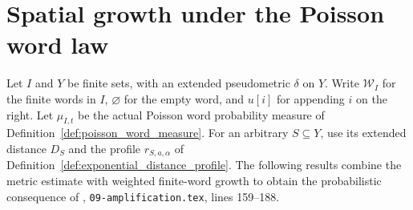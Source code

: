 \section{Spatial growth under the Poisson word law}
\label{sec:poisson_word_spatial_growth}

Let $I$ and $Y$ be finite sets, with an extended pseudometric
$\delta$ on $Y$.  Write $\mathcal W_I$ for the finite words in $I$,
$\varnothing$ for the empty word, and $u[i]$ for appending $i$ on
the right.  Let $\mu_{I,t}$ be the actual Poisson word probability
measure of Definition~\ref{def:poisson_word_measure}.
For an arbitrary $S\subseteq Y$, use its extended distance $D_S$
and the profile $r_{S,a,\alpha}$ of
Definition~\ref{def:exponential_distance_profile}.
The following results combine the metric estimate with weighted
finite-word growth to obtain the probabilistic consequence of
\cite{OpenAI2026AreaLaw}, \texttt{09-amplification.tex}, lines 159--188.

